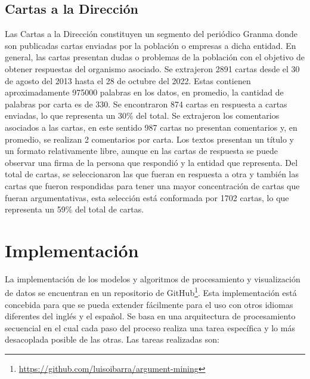 \subsection{Cartas a la Dirección}

Las Cartas a la Dirección constituyen un segmento del periódico Granma donde son publicadas
cartas enviadas por la población o empresas a dicha entidad. En general, las cartas 
presentan dudas o problemas de la población con el objetivo de obtener respuestas del organismo
asociado. Se extrajeron 2891 cartas desde el 30 de agosto del 2013 hasta el 28 de octubre del 2022. Estas 
contienen aproximadamente 975000 palabras en los datos, en promedio, la cantidad de palabras por carta es de 330.
Se encontraron 874 cartas en respuesta a cartas enviadas, lo que representa un 30\% del total. Se extrajeron
los comentarios asociados a las cartas, en este sentido 987 cartas no presentan comentarios y, en promedio, 
se realizan 2 comentarios por carta. Los textos presentan un título y un formato relativamente libre, 
aunque en las cartas de respuesta se puede observar una firma de la persona que respondió y la entidad que 
representa. Del total de cartas, se seleccionaron las que fueran en respuesta a otra y también las 
cartas que fueron respondidas para tener una mayor concentración de cartas que fueran argumentativas, 
esta selección está conformada por 1702 cartas, lo que representa un 59\% del total de cartas.

\section{Implementación}

La implementación de los modelos y algoritmos de procesamiento y visualización de datos se encuentran en 
un repositorio de GitHub\footnote{\url{https://github.com/luisoibarra/argument-mining}}. Esta implementación
está concebida para que se pueda extender fácilmente para el uso con otros idiomas diferentes del inglés y el 
español. Se basa en una arquitectura de procesamiento secuencial en el cual cada paso del proceso realiza
una tarea específica y lo más desacoplada posible de las otras. Las tareas realizadas son:

